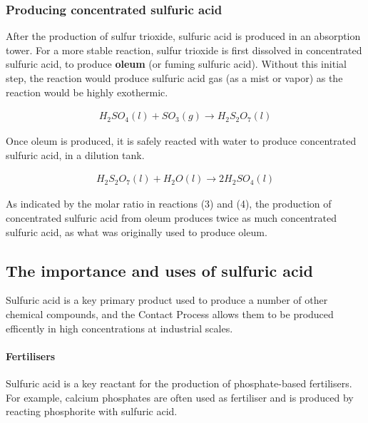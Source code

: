 \documentclass[12pt, a4paper]{article}
\begin{document}
\pagebreak






\subsubsection{Producing concentrated sulfuric acid}

After the production of sulfur trioxide, sulfuric acid is produced in an absorption tower. For a more stable reaction, sulfur trioxide is first dissolved in concentrated sulfuric acid, to produce \textbf{oleum} (or fuming sulfuric acid). Without this initial step, the reaction would produce sulfuric acid gas (as a mist or vapor) as the reaction would be highly exothermic.

\begin{align}
	H_{2}SO_{4}(l) + SO_{3}(g) \rightarrow H_{2}S_{2}O_{7}(l)
\end{align}

Once oleum is produced, it is safely reacted with water to produce concentrated sulfuric acid, in a dilution tank.

\begin{align}
	H_{2}S_{2}O_{7}(l) + H_{2}O(l) \rightarrow 2H_{2}SO_{4}(l)
\end{align}

As indicated by the molar ratio in reactions (3) and (4), the production of concentrated sulfuric acid from oleum produces twice as much concentrated sulfuric acid, as what was originally used to produce oleum.






\subsection{The importance and uses of sulfuric acid}

Sulfuric acid is a key primary product used to produce a number of other chemical compounds, and the Contact Process allows them to be produced efficently in high concentrations at industrial scales. 

\paragraph{Fertilisers}
Sulfuric acid is a key reactant for the production of phosphate-based fertilisers. For example, calcium phosphates are often used as fertiliser and is produced by reacting phosphorite with sulfuric acid.
\end{document}
